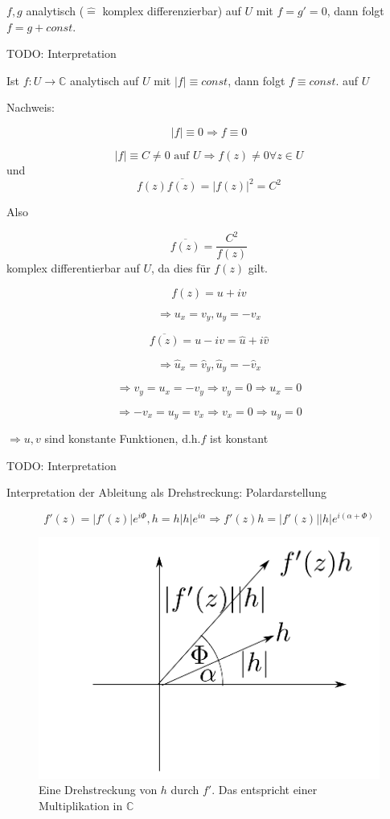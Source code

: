 \documentclass[10pt,a4paper]{article}
\begin{document}
\begin{satz}
$f,g$ analytisch ($\hat{=}$ komplex differenzierbar) auf $U$ mit $f=g'=0$, dann folgt $f=g+const.$ 

TODO: Interpretation

\end{satz}

\begin{satz}
Ist $f:U \rightarrow \mathbb{C}$ analytisch auf $U$ mit $|f| \equiv const$, dann folgt $f \equiv const.$ auf $U$

Nachweis:

$$|f| \equiv 0 \Rightarrow f \equiv 0$$


$$|f| \equiv C \not= 0 \text{ auf } U \Rightarrow f(z) \not= 0 \forall z \in U $$ und 
$$ f(z) \overline{f(z)}=|f(z)|^{2}=C^{2}$$

Also

$$\overline{f(z)}=\frac{C^{2}}{f(z)}$$ komplex differentierbar auf $U$, da dies für $f(z)$ gilt.

$$f(z)=u+iv$$

$$\Rightarrow u_x=v_y, u_y=-v_x$$

$$\overline{f(z)}=u-iv = \hat{u}+i\hat{v}$$

$$\Rightarrow \hat{u}_x=\hat{v}_y, \hat{u}_y=-\hat{v}_x$$

$$\Rightarrow v_y=u_x=-v_y \Rightarrow v_y=0 \Rightarrow u_x=0$$

$$\Rightarrow -v_x=u_y=v_x \Rightarrow v_x=0 \Rightarrow u_y=0$$

$\Rightarrow u, v$ sind konstante Funktionen, d.h.$f$ ist konstant

TODO: Interpretation

\end{satz}


Interpretation der Ableitung als Drehstreckung:
Polardarstellung

$$f'(z)=|f'(z)| e^{i \Phi}, h=h|h|e^{i \alpha} \Rightarrow f'(z)h=|f'(z)||h|e^{i(\alpha + \Phi)}$$

\begin{figure}[H]
\includegraphics[width=\textwidth]{images/complex_multi}
\caption{Eine Drehstreckung von $h$ durch $f'$. Das entspricht einer Multiplikation in $\mathbb{C}$}
\end{figure}
\end{document}
